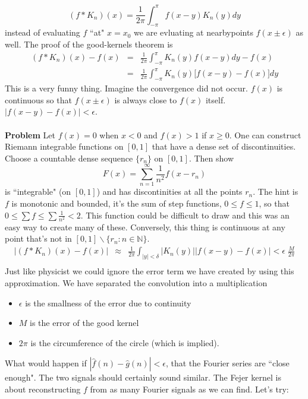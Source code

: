 \documentclass[12pt]{article}
\begin{document}
$$ (f * K_n) (x) = \frac{1}{2\pi} \int_{-\pi}^\pi f(x-y) K_n(y) dy $$
instead of evaluating $f$ ``at" $x = x_0$ we are evluating at nearbypoints $f(x \pm \epsilon)$ as well.  The proof of the good-kernels theorem is
\begin{eqnarray*}
(f * K_n)(x) - f(x) &=& \frac{1}{2\pi} \int_{-\pi}^\pi K_n (y) f(x-y) dy - f(x) \\ 
&=& \frac{1}{2\pi} \int_{-\pi}^\pi K_n(y) \big[ f(x-y) - f(x)\big] dy 
\end{eqnarray*}
This is a very funny thing.  Imagine the convergence did not occur.  $f(x)$ is continuous so that $f(x\pm \epsilon)$ is always close to $f(x)$ itself.  $|f(x-y) - f(x) |< \epsilon$. \\ \\ 
\textbf{Problem} Let $f(x) = 0$ when $x < 0$ and $f(x) > 1$ if $x \geq 0$.  One can construct Riemann integrable functions on $[0,1]$ that have a dense set of discontinuities.  Choose a countable dense sequence $\{ r_n\}$ on $[0,1]$.  Then show 
$$ F(x) = \sum_{n = 1}^\infty \frac{1}{n^2} f(x - r_n) $$
is ``integrable" (on $[0,1]$) and has discontinities at all the points $r_n$.  The hint is $f$ is monotonic and bounded, it's the sum of step functions, $0 \leq f \leq 1$, so that $0 \leq \sum f \leq \sum \frac{1}{n^2} < 2$.  This function could be difficult to draw and this was an easy way to create many of these.  Conversely, this thing is continuous at any point that's not in $[0,1] \backslash \{ r_n : n \in \mathbb{N}\}$.
\begin{eqnarray*}
|(f*K_n)(x) - f(x)| & \approx & \frac{1}{2\pi} \int_{|y|< \delta } |K_n(y)| |f(x-y) - f(x)| < \epsilon \; \frac{M}{2\pi} \\
\end{eqnarray*}  
Just like physicist we could ignore the error term we have created by using this approximation.  We have separated the convolution into a multiplication
\begin{itemize}
\item $\epsilon$ is the smallness of the error due to continuity
\item $M$ is the error of the good kernel
\item $2\pi$ is the circumference of the circle (which is implied). 
\end{itemize}
What would happen if $|\hat{f}(n) - \hat{g}(n) | < \epsilon$, that the Fourier series are ``close enough".  The two signals should certainly sound similar.  The Fejer kernel is about reconstructing $f$ from as many Fourier signals as we can find.  Let's try:
\end{document}
